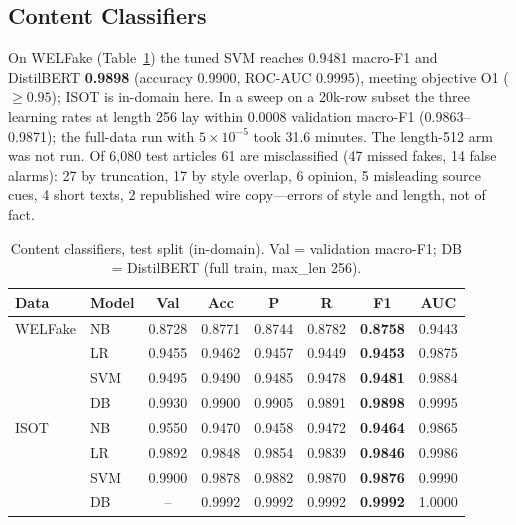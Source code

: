 \documentclass[conference]{IEEEtran}
\begin{document}
\subsection{Content Classifiers}
On WELFake (Table~\ref{tab:clf}) the tuned SVM reaches 0.9481 macro-F1 and DistilBERT \textbf{0.9898} (accuracy 0.9900, ROC-AUC 0.9995), meeting objective O1 ($\geq 0.95$); ISOT is in-domain here. In a sweep on a 20k-row subset the three learning rates at length 256 lay within 0.0008 validation macro-F1 (0.9863--0.9871); the full-data run with $5\times10^{-5}$ took 31.6 minutes. The length-512 arm was not run. Of 6{,}080 test articles 61 are misclassified (47 missed fakes, 14 false alarms): 27 by truncation, 17 by style overlap, 6 opinion, 5 misleading source cues, 4 short texts, 2 republished wire copy---errors of style and length, not of fact.

\begin{table}[t]
\caption{Content classifiers, test split (in-domain). Val = validation macro-F1; DB = DistilBERT (full train, max\_len 256).}
\label{tab:clf}
\centering\footnotesize
\setlength{\tabcolsep}{3pt}
\begin{tabular}{@{}l l c c c c c c@{}}
\toprule
Data & Model & Val & Acc & P & R & \textbf{F1} & AUC \\
\midrule
WELFake & NB  & 0.8728 & 0.8771 & 0.8744 & 0.8782 & \textbf{0.8758} & 0.9443 \\
        & LR  & 0.9455 & 0.9462 & 0.9457 & 0.9449 & \textbf{0.9453} & 0.9875 \\
        & SVM & 0.9495 & 0.9490 & 0.9485 & 0.9478 & \textbf{0.9481} & 0.9884 \\
        & DB  & 0.9930 & 0.9900 & 0.9905 & 0.9891 & \textbf{0.9898} & 0.9995 \\
\midrule
ISOT    & NB  & 0.9550 & 0.9470 & 0.9458 & 0.9472 & \textbf{0.9464} & 0.9865 \\
        & LR  & 0.9892 & 0.9848 & 0.9854 & 0.9839 & \textbf{0.9846} & 0.9986 \\
        & SVM & 0.9900 & 0.9878 & 0.9882 & 0.9870 & \textbf{0.9876} & 0.9990 \\
        & DB  & --     & 0.9992 & 0.9992 & 0.9992 & \textbf{0.9992} & 1.0000 \\
\bottomrule
\end{tabular}
\end{table}
\end{document}
